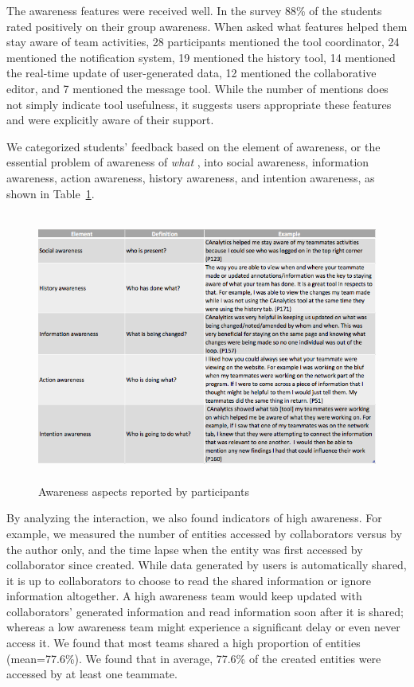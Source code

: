 The awareness features were received well. In the survey 88\% of the
students rated positively on their group awareness. When asked what
features helped them stay aware of team activities, 28 participants
mentioned the tool coordinator, 24 mentioned the notification system, 19
mentioned the history tool, 14 mentioned the real-time update of
user-generated data, 12 mentioned the collaborative editor, and 7
mentioned the message tool. While the number of mentions does not simply
indicate tool usefulness, it suggests users appropriate these features
and were explicitly aware of their support.

We categorized students' feedback based on the element of awareness, or
the essential problem of awareness of \emph{what}
\autocite{Schmidt2002}, into social awareness, information awareness,
action awareness, history awareness, and intention awareness, as shown
in Table~\ref{tab:awareness}.

\begin{figure}
\centering
\includegraphics[height=3.5in]{./img/awareness.png}
\caption{Awareness aspects reported by
participants}\label{tab:awareness}
\end{figure}

By analyzing the interaction, we also found indicators of high
awareness. For example, we measured the number of entities accessed by
collaborators versus by the author only, and the time lapse when the
entity was first accessed by collaborator since created. While data
generated by users is automatically shared, it is up to collaborators to
choose to read the shared information or ignore information altogether.
A high awareness team would keep updated with collaborators' generated
information and read information soon after it is shared; whereas a low
awareness team might experience a significant delay or even never access
it. We found that most teams shared a high proportion of entities
(mean=77.6\%). We found that in average, 77.6\% of the created entities
were accessed by at least one teammate.

